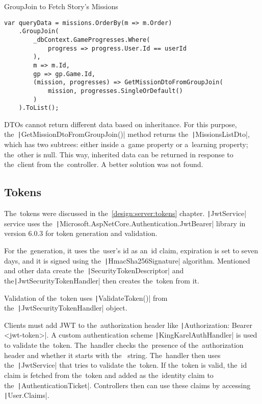 \begin{listing}
    \caption{GroupJoin to Fetch Story's Missions}
    \label{listing:groupjoin}
    \begin{verbatim}
var queryData = missions.OrderBy(m => m.Order)
    .GroupJoin(
        _dbContext.GameProgresses.Where(
            progress => progress.User.Id == userId
        ),
        m => m.Id,
        gp => gp.Game.Id,
        (mission, progresses) => GetMissionDtoFromGroupJoin(
            mission, progresses.SingleOrDefault()
        )
    ).ToList();
    \end{verbatim}
\end{listing}

DTOs cannot return different data based on inheritance.
For this purpose, the~\texttt|GetMissionDtoFromGroupJoin()| method returns the~\texttt|MissionsListDto|, which has two subtrees: either inside a~game property or a~learning property; the~other is null.
This way, inherited data can be returned in response to the~client from the~controller.
A better solution was not found.

\subsection{Tokens}

The~tokens were discussed in the~\ref{design:server:tokens} chapter.
\texttt|JwtService| service uses the~\texttt|Microsoft.AspNetCore.Authentication.JwtBearer| library in version 6.0.3 for token generation and validation.

For the~generation, it uses the~user's id as an~id claim, expiration is set to seven days, and it is signed using the~\texttt|HmacSha256Signature| algorithm.
\linebreak
Mentioned and other data create the~\texttt|SecurityTokenDescriptor| and the\linebreak{}\texttt|JwtSecurityTokenHandler| then creates the~token from it.

Validation of the~token uses \texttt|ValidateToken()| from the~\linebreak\texttt|JwtSecurityTokenHandler| object.

Clients must add JWT to the~authorization header like \linebreak\texttt|Authorization: Bearer <jwt-token>|.
A custom authentication scheme \linebreak\texttt|KingKarelAuthHandler| is used to validate the~token.
The~handler checks the~presence of the~authorization header and whether it starts with the~ string.
The~handler then uses the~\texttt|JwtService| that tries to validate the~token.
If the~token is valid, the~id claim is fetched from the~token and added as the~identity claim to the~\texttt|AuthenticationTicket|.
Controllers then can use these claims by accessing \texttt|User.Claims|.

